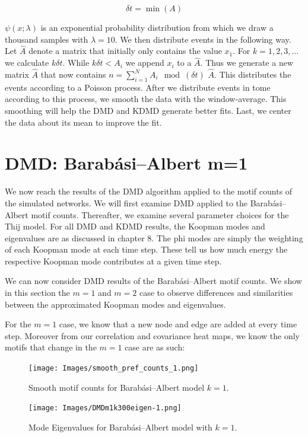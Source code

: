 $$
\delta t = \min(A)
$$

 $\psi(x;\lambda)$ is an exponential probability distribution from which we draw a thousand samples with $\lambda=10$.
  We then distribute events in the following
way. Let ${\hat A}$ denote a matrix that initially only contains the value $x_1$. For $k=1,2,3,\dots$ we calculate $k \delta t$. While $k\delta t < A_i$ we append $x_i$ to 
a ${\hat A}$. Thus we generate a new matrix ${\hat A}$ that now contains $n = \sum^{N}_{i=1} A_i \mod(\delta t)$ 
${\hat A}$. This distributes the events according to a Poisson process. After we distribute events in tome according to this process, we
 smooth the data with the window-average. This smoothing will help the DMD and KDMD generate better fits. Last, we center the data about its mean to improve the fit.

\section{DMD: Barabási–Albert m=1}
We now reach the results of the DMD algorithm applied to the
motif counts of the simulated networks. We will first examine DMD applied to the 
Barabási–Albert motif counts. Thereafter, we examine several parameter choices for the Thij model.
For all DMD and KDMD results, the Koopman modes
 and eigenvalues are as discussed in chapter 8. The phi modes are simply the weighting of each Koopman mode 
 at each time step. These tell us how much energy the respective Koopman mode contributes at a given time
step.

We can now consider DMD results of the Barabási–Albert motif counts. We show in this section
the $m=1$ and $m=2$ case to observe differences and similarities between the approximated 
Koopman modes and eigenvalues. 

For the $m=1$ case, we know that a new node and edge are added at every time step. Moreover from our
correlation and covariance heat maps, we know the only motifs that change in the $m=1$ case 
are as such: 

\newpage

\begin{figure}
    \texttt{[image: Images/smooth\_pref\_counts\_1.png]}
    \centering
    \caption{Smooth motif counts for Barabási–Albert model $k=1$.}
\end{figure}
\clearpage

\begin{figure}
    \texttt{[image: Images/DMDm1k300eigen-1.png]}
    \centering
    \caption{Mode Eigenvalues for Barabási–Albert model
    with $k=1$.}
\end{figure}

